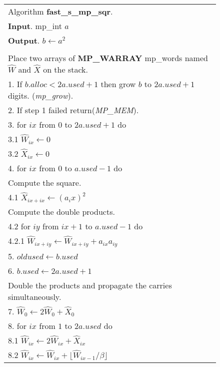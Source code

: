 \documentclass[b5paper]{book}
\begin{document}
\newpage\begin{figure}[!here]
\begin{small}
\begin{center}
\begin{tabular}{l}
\hline Algorithm \textbf{fast\_s\_mp\_sqr}. \\
\textbf{Input}.   mp\_int $a$ \\
\textbf{Output}.  $b \leftarrow a^2$ \\
\hline \\
Place two arrays of \textbf{MP\_WARRAY} mp\_words named $\hat W$ and $\hat {X}$ on the stack. \\
1.  If $b.alloc < 2a.used + 1$ then grow $b$ to $2a.used + 1$ digits.  (\textit{mp\_grow}). \\
2.  If step 1 failed return(\textit{MP\_MEM}). \\
3.  for $ix$ from $0$ to $2a.used + 1$ do \\
\hspace{3mm}3.1  $\hat W_{ix} \leftarrow 0$ \\
\hspace{3mm}3.2  $\hat {X}_{ix} \leftarrow 0$ \\
4.  for $ix$ from $0$ to $a.used - 1$ do \\
\hspace{3mm}Compute the square.\\
\hspace{3mm}4.1  $\hat {X}_{ix+ix} \leftarrow \left ( a_ix \right )^2$ \\
\hspace{3mm}Compute the double products.\\
\hspace{3mm}4.2  for $iy$ from $ix + 1$ to $a.used - 1$ do \\
\hspace{6mm}4.2.1  $\hat W_{ix+iy} \leftarrow \hat W_{ix+iy} + a_{ix}a_{iy}$ \\
5.  $oldused \leftarrow b.used$ \\
6.  $b.used \leftarrow 2a.used + 1$ \\
Double the products and propagate the carries simultaneously. \\
7.  $\hat W_0 \leftarrow 2 \hat W_0 + \hat {X}_0$ \\
8.  for $ix$ from $1$ to $2a.used$ do \\
\hspace{3mm}8.1 $\hat W_{ix} \leftarrow 2 \hat W_{ix} + \hat {X}_{ix}$ \\
\hspace{3mm}8.2 $\hat W_{ix} \leftarrow \hat W_{ix} + \lfloor \hat W_{ix - 1} / \beta \rfloor$ \\

\end{tabular}
\end{center}
\end{small}
\end{figure}
\end{document}
